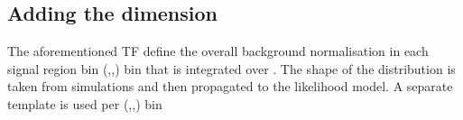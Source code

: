 


\subsection{Adding the \mht dimension}

The aforementioned TF define the overall background normalisation in each signal region bin (\njet,\nb,\HT) bin that is
integrated over \mht. The shape of the \mht distribution is taken from simulations and then propagated to the likelihood model. 
A separate \mht template is used per (\njet,\nb,\HT) bin


